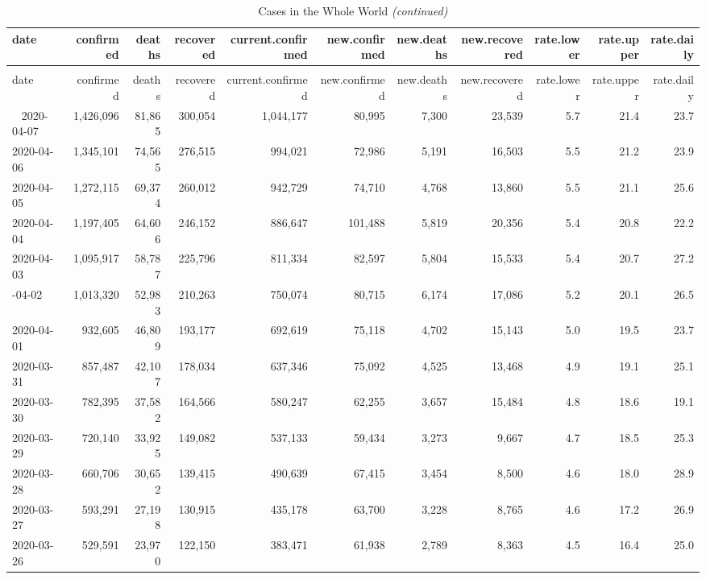 \documentclass[12pt, a4paper,oneside]{book}
\theoremstyle{definition}
\begin{document}
\begin{longtable}{lrrrrrrrrrr}
	\caption{Dữ liệu COVID-19 trên toàn thế giới} \label{bA1}\\
	\toprule
	date & confirmed & deaths & recovered & current.confirmed & new.confirmed & new.deaths & new.recovered & rate.lower & rate.upper & rate.daily\\
	\midrule
	\endfirsthead
	\caption[]{Cases in the Whole World \textit{(continued)}}\\
	\toprule
	date & confirmed & deaths & recovered & current.confirmed & new.confirmed & new.deaths & new.recovered & rate.lower & rate.upper & rate.daily\\
	\midrule
	\endhead
	\
	\endfoot
	\bottomrule
	\endlastfoot
	\rowcolor{gray!6}  2020-04-07 & 1,426,096 & 81,865 & 300,054 & 1,044,177 & 80,995 & 7,300 & 23,539 & 5.7 & 21.4 & 23.7\\
	2020-04-06 & 1,345,101 & 74,565 & 276,515 & 994,021 & 72,986 & 5,191 & 16,503 & 5.5 & 21.2 & 23.9\\
	\rowcolor{gray!6}  2020-04-05 & 1,272,115 & 69,374 & 260,012 & 942,729 & 74,710 & 4,768 & 13,860 & 5.5 & 21.1 & 25.6\\
	2020-04-04 & 1,197,405 & 64,606 & 246,152 & 886,647 & 101,488 & 5,819 & 20,356 & 5.4 & 20.8 & 22.2\\
	\rowcolor{gray!6}  2020-04-03 & 1,095,917 & 58,787 & 225,796 & 811,334 & 82,597 & 5,804 & 15,533 & 5.4 & 20.7 & 27.2\\
	\addlinespace
	2020-04-02 & 1,013,320 & 52,983 & 210,263 & 750,074 & 80,715 & 6,174 & 17,086 & 5.2 & 20.1 & 26.5\\
	\rowcolor{gray!6}  2020-04-01 & 932,605 & 46,809 & 193,177 & 692,619 & 75,118 & 4,702 & 15,143 & 5.0 & 19.5 & 23.7\\
	2020-03-31 & 857,487 & 42,107 & 178,034 & 637,346 & 75,092 & 4,525 & 13,468 & 4.9 & 19.1 & 25.1\\
	\rowcolor{gray!6}  2020-03-30 & 782,395 & 37,582 & 164,566 & 580,247 & 62,255 & 3,657 & 15,484 & 4.8 & 18.6 & 19.1\\
	2020-03-29 & 720,140 & 33,925 & 149,082 & 537,133 & 59,434 & 3,273 & 9,667 & 4.7 & 18.5 & 25.3\\
	\addlinespace
	\rowcolor{gray!6}  2020-03-28 & 660,706 & 30,652 & 139,415 & 490,639 & 67,415 & 3,454 & 8,500 & 4.6 & 18.0 & 28.9\\
	2020-03-27 & 593,291 & 27,198 & 130,915 & 435,178 & 63,700 & 3,228 & 8,765 & 4.6 & 17.2 & 26.9\\
	\rowcolor{gray!6}  2020-03-26 & 529,591 & 23,970 & 122,150 & 383,471 & 61,938 & 2,789 & 8,363 & 4.5 & 16.4 & 25.0\\

\end{longtable}
\end{document}
